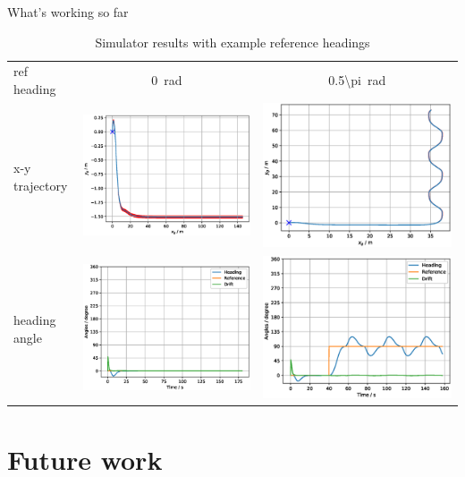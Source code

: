 \documentclass[10pt,xcolor={table,dvipsnames},t]{beamer}
\begin{document}
\begin{frame}{What's working so far}
\begin{table}[h]
    \centering
    \begin{tabular}{lcc}
    ref heading &\SI{0}{\radian} & \SI{0.5\pi}{\radian} \\
    x-y trajectory & \includegraphics[width = 0.35\linewidth]{documents/figures/trajectories_ref0.eps} &
    \includegraphics[width = 0.35\linewidth]{documents/figures/trajectories_0.5pi.eps} \\
    heading angle & \includegraphics[width = 0.35\linewidth]{documents/figures/heading_ref0.eps} & 
    \includegraphics[width = 0.35\linewidth]{documents/figures/heading_0.5pi.eps}
    \end{tabular}
    \caption{Simulator results with example reference headings}
    \label{tab:plots}
\end{table}
\end{frame}


\section{Future work}
\end{document}
